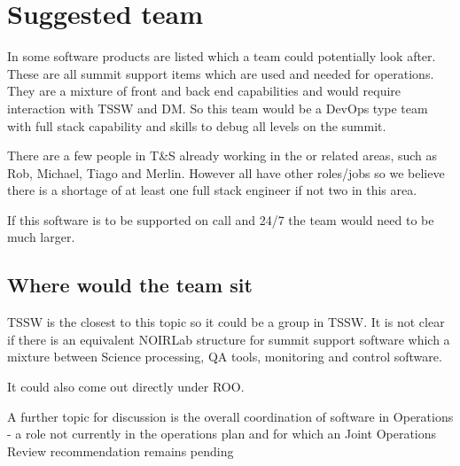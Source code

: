 \section{Suggested team} \label{sec:team}

In  some \gls{software} products are listed which a team could potentially look after.
These are all summit support items which are used and needed for operations.
They are a mixture of front and back end capabilities and would require interaction with TSSW and \gls{DM}.
So this team would be a DevOps type team with full \gls{stack} capability and skills to debug all levels on the summit.

There are a few people in T\&S already working in the or related areas, such as Rob, Michael, Tiago and Merlin.
However all have other roles/jobs so we believe there is a shortage of at least one full \gls{stack} engineer if not two in this area.


If this \gls{software} is to be supported on call and 24/7 the team would need to be much larger.


\subsection{Where would the team sit}
TSSW is the closest to this topic so it could be a group in TSSW.
It is not clear if there is an equivalent \gls{NOIRLab} structure for summit support \gls{software} which
a mixture between Science processing, \gls{QA} tools, \gls{monitoring} and control software.

It could also come out directly under \gls{ROO}.

A further topic for discussion is the overall coordination of software in \VRO  \gls{Operations} - a role not currently in the operations plan and for which an Joint \gls{Operations} \gls{Review} recommendation remains pending

